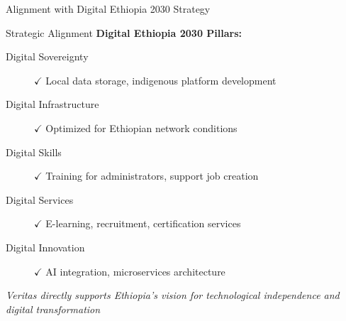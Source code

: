\begin{frame}{Alignment with Digital Ethiopia 2030 Strategy}
    \begin{block}{Strategic Alignment}
        \textbf{Digital Ethiopia 2030 Pillars:}
        \begin{description}
            \item[Digital Sovereignty] $\checkmark$ Local data storage, indigenous platform development
            \item[Digital Infrastructure] $\checkmark$ Optimized for Ethiopian network conditions
            \item[Digital Skills] $\checkmark$ Training for administrators, support job creation
            \item[Digital Services] $\checkmark$ E-learning, recruitment, certification services
            \item[Digital Innovation] $\checkmark$ AI integration, microservices architecture
        \end{description}
    \end{block}
    
    \vspace{0.3cm}
    \begin{center}
        \textit{Veritas directly supports Ethiopia's vision for technological independence and digital transformation}
    \end{center}
\end{frame}

